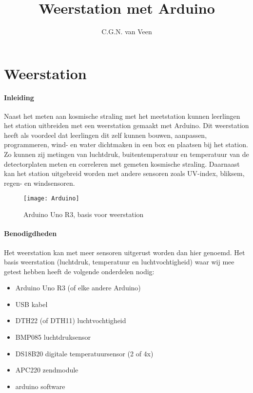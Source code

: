 

\title{Weerstation met Arduino}
\author{C.G.N. van Veen}



\maketitle

\section{Weerstation}

\paragraph{Inleiding}
Naast het meten aan kosmische straling met het \hisparc meetstation kunnen  
leerlingen het \hisparc station uitbreiden met een weerstation gemaakt met Arduino.
Dit weerstation heeft als voordeel dat leerlingen dit zelf kunnen bouwen, aanpassen,
programmeren, wind- en water dichtmaken in een box en plaatsen bij het station.
Zo kunnen zij metingen van luchtdruk, buitentemperatuur en temperatuur van de 
detectorplaten meten en correleren met gemeten kosmische straling. Daarnaast 
kan het station uitgebreid worden met andere sensoren zoals UV-index, bliksem, 
regen- en windsensoren.

\begin{figure}
    \centering
    \texttt{[image: Arduino]}
    \caption{Arduino Uno R3, basis voor weerstation}
   \label{fig:Arduino}
\end{figure}

\paragraph{Benodigdheden}
Het weerstation kan met meer sensoren uitgerust worden dan hier genoemd.
Het basis weerstation (luchtdruk, temperatuur en luchtvochtigheid) waar wij mee
getest hebben heeft de volgende onderdelen nodig: \\
\begin{itemize}
    \item Arduino Uno R3 (of elke andere Arduino)
    \item USB kabel
    \item DTH22 (of DTH11) luchtvochtigheid
    \item BMP085 luchtdruksensor
    \item DS18B20 digitale temperatuursensor (2 of 4x)
    \item APC220 zendmodule
    \item arduino software
\end{itemize}

